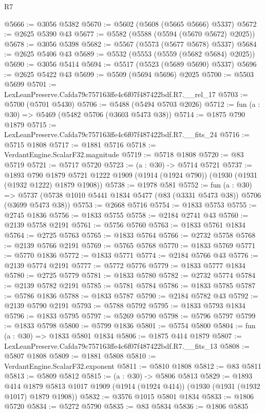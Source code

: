 \begin{lexlean}{R7}
\begin{coremodule}
@5666 := @3056 @5382
@5670 := @5602 (@5608 (@5665 @5666) @5337)
@5672 := @2625 @5390 @43
@5677 := @5582 (@5588 (@5594 (@5670 @5672) @2025))
@5678 := @3056 @5398
@5682 := @5567 (@5573 (@5677 @5678) @5337)
@5684 := @2625 @5406 @43
@5689 := @5532 (@5553 (@5559 (@5682 @5684) @2025))
@5690 := @3056 @5414
@5694 := @5517 (@5523 (@5689 @5690) @5337)
@5696 := @2625 @5422 @43
@5699 := @5509 (@5694 @5696) @2025
@5700 := @5503 @5699
@5701 := LexLeanPreserve.Cafda79c757163ffe4c6f07f487422bdf.R7.__rel_17
@5703 := @5700 (@5701 @5430)
@5706 := @5488 (@5494 @5703 @2026)
@5712 := fun (a : @30) => @5469 (@5482 @5706 (@3603 @5473 @38))
@5714 := @1875 @790 @1879
@5715 := LexLeanPreserve.Cafda79c757163ffe4c6f07f487422bdf.R7.__fits_24
@5716 := @5715 @1808
@5717 := @1881 @5716
@5718 := VerdantEngine.ScalarF32.magnitude
@5719 := @5718 @1808
@5720 := @83 @5719
@5721 := @5717 @5720
@5723 := (a : @30) -> @5714 @5721
@5737 := @1893
    @790
    @1879
    @5721
    @1222
    @1909
    (@1914 (@1924 @790))
    (@1930 (@1931 (@1932 @1222) @1879 @1908))
@5738 := @1978 @581
@5752 := fun (a : @30) =>
  @5737 (@5738 @1010 @5441 @1834 @5477 (@83 (@3331 @5473 @38)) @5706 (@3699 @5473 @38))
@5753 := @2668 @5716
@5754 := @1833 @5753
@5755 := @2745 @1836
@5756 := @1833 @5755
@5758 := @2184 @2741 @43
@5760 := @2139 @5758 @2191
@5761 := @5756 @5760
@5763 := @1833 @5761 @1834
@5764 := @2725 @5763
@5765 := @1833 @5764
@5766 := @2732 @5758
@5768 := @2139 @5766 @2191
@5769 := @5765 @5768
@5770 := @1833 @5769
@5771 := @5770 @1836
@5772 := @1833 @5771
@5774 := @2184 @5766 @43
@5776 := @2139 @5774 @2191
@5777 := @5772 @5776
@5779 := @1833 @5777 @1834
@5780 := @2725 @5779
@5781 := @1833 @5780
@5782 := @2732 @5774
@5784 := @2139 @5782 @2191
@5785 := @5781 @5784
@5786 := @1833 @5785
@5787 := @5786 @1836
@5788 := @1833 @5787
@5790 := @2184 @5782 @43
@5792 := @2139 @5790 @2191
@5793 := @5788 @5792
@5795 := @1833 @5793 @1834
@5796 := @1833 @5795
@5797 := @5269 @5790
@5798 := @5796 @5797
@5799 := @1833 @5798
@5800 := @5799 @1836
@5801 := @5754 @5800
@5804 := fun (a : @30) => @1833 @5801 @1834
@5806 := @1875 @414 @1879
@5807 := LexLeanPreserve.Cafda79c757163ffe4c6f07f487422bdf.R7.__fits_13
@5808 := @5807 @1808
@5809 := @1881 @5808
@5810 := VerdantEngine.ScalarF32.exponent
@5811 := @5810 @1808
@5812 := @83 @5811
@5813 := @5809 @5812
@5815 := (a : @30) -> @5806 @5813
@5829 := @1893
    @414
    @1879
    @5813
    @1017
    @1909
    (@1914 (@1924 @414))
    (@1930 (@1931 (@1932 @1017) @1879 @1908))
@5832 := @3576 @1015 @5801 @1834
@5833 := @1806 @5720
@5834 := @5272 @5790
@5835 := @83 @5834
@5836 := @1806 @5835

\end{coremodule}
\end{lexlean}
